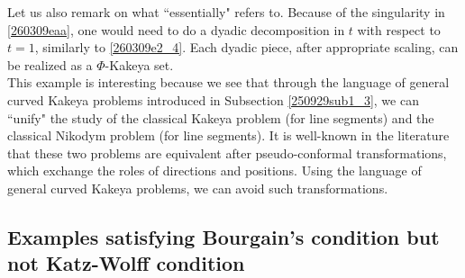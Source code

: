 \documentclass{article}
\numberwithin{equation}{section}
\theoremstyle{plain}
\begin{document}
	Let us also remark on what ``essentially" refers to. Because of the singularity in \eqref{260309eaa}, one would need to do a dyadic decomposition in $t$ with respect to $t=1$, similarly to \eqref{260309e2_4}. Each dyadic piece, after appropriate scaling, can be realized as a $\Phi$-Kakeya set. \\


This example is interesting  because we see that through the language of general curved Kakeya problems introduced in Subsection \ref{250929sub1_3}, we can ``unify" the study of the classical Kakeya problem (for line segments) and the classical Nikodym problem (for line segments). It is well-known in the literature that these two problems are equivalent after pseudo-conformal transformations, which exchange the roles of directions and positions. Using the language of general curved Kakeya problems, we can avoid such transformations. \\ 





\subsection{Examples satisfying Bourgain's condition but not Katz-Wolff condition}\label{260526subsec2_3}
\end{document}
